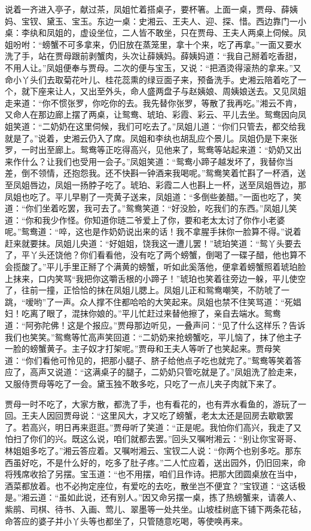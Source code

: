 \documentclass[12pt,oneside]{book}
\begin{document}
说着一齐进入亭子，献过茶，凤姐忙着搭桌子，要杯箸。上面一桌，贾母、薛姨妈、宝钗、黛玉、宝玉。东边一桌：史湘云、王夫人、迎、探、惜。西边靠门一小桌：李纨和凤姐的，虚设坐位，二人皆不敢坐，只在贾母、王夫人两桌上伺候。凤姐吩咐：“螃蟹不可多拿来，仍旧放在蒸笼里，拿十个来，吃了再拿。”一面又要水洗了手，站在贾母跟前剥蟹肉，头次让薛姨妈。薛姨妈道：“我自己掰着吃香甜，不用人让。”凤姐便奉与贾母。二次的便与宝玉，又说：“把酒烫得滚热的拿来。”又命小丫头们去取菊花叶儿、桂花蕊熏的绿豆面子来，预备洗手。史湘云陪着吃了一个，就下座来让人，又出至外头，命人盛两盘子与赵姨娘、周姨娘送去。又见凤姐走来道：“你不惯张罗，你吃你的去。我先替你张罗，等散了我再吃。”湘云不肯，又命人在那边廊上摆了两桌，让鸳鸯、琥珀、彩霞、彩云、平儿去坐。鸳鸯因向凤姐笑道：“二奶奶在这里伺候，我们可吃去了。”凤姐儿道：“你们只管去，都交给我就是了。”说着，史湘云仍入了席。凤姐和李纨也胡乱应个景儿。凤姐仍是下来张罗，一时出至廊上。鸳鸯等正吃得高兴，见他来了，鸳鸯等站起来道：“奶奶又出来作什么？让我们也受用一会子。”凤姐笑道：“鸳鸯小蹄子越发坏了，我替你当差，倒不领情，还抱怨我。还不快斟一钟酒来我喝呢。”鸳鸯笑着忙斟了一杯酒，送至凤姐唇边，凤姐一扬脖子吃了。琥珀、彩霞二人也斟上一杯，送至凤姐唇边，那凤姐也吃了。平儿早剔了一壳黄子送来，凤姐道：“多倒些姜醋。”一面也吃了，笑道：“你们坐着吃罢，我可去了。”鸳鸯笑道：“好没脸，吃我们的东西。”凤姐儿笑道：“你和我少作怪。你知道你琏二爷爱上了你，要和老太太讨了你作小老婆呢。”鸳鸯道：“啐，这也是作奶奶说出来的话！我不拿腥手抹你一脸算不得。”说着赶来就要抹。凤姐儿央道：“好姐姐，饶我这一遭儿罢！”琥珀笑道：“鸳丫头要去了，平丫头还饶他？你们看看他，没有吃了两个螃蟹，倒喝了一碟子醋，他也算不会揽酸了。”平儿手里正掰了个满黄的螃蟹，听如此奚落他，便拿着螃蟹照着琥珀脸上抹来，口内笑骂“我把你这嚼舌根的小蹄子！”琥珀也笑着往旁边一躲，平儿使空了，往前一撞，正恰恰的抹在凤姐儿腮上。凤姐儿正和鸳鸯嘲笑，不防唬了一跳，“嗳哟”了一声。众人撑不住都哈哈的大笑起来。凤姐也禁不住笑骂道：“死娼妇！吃离了眼了，混抹你娘的。”平儿忙赶过来替他擦了，亲自去端水。鸳鸯道：“阿弥陀佛！这是个报应。”贾母那边听见，一叠声问：“见了什么这样乐？告诉我们也笑笑。”鸳鸯等忙高声笑回道：“二奶奶来抢螃蟹吃，平儿恼了，抹了他主子一脸的螃蟹黄子。主子奴才打架呢。”贾母和王夫人等听了也笑起来。贾母笑道：“你们看他可怜见的，把那小腿子、脐子给他点子吃也就完了。”鸳鸯等笑着答应了，高声又说道：“这满桌子的腿子，二奶奶只管吃就是了。”凤姐洗了脸走来，又服侍贾母等吃了一会。黛玉独不敢多吃，只吃了一点儿夹子肉就下来了。

贾母一时不吃了，大家方散，都洗了手，也有看花的，也有弄水看鱼的，游玩了一回。王夫人因回贾母说：“这里风大，才又吃了螃蟹，老太太还是回房去歇歇罢了。若高兴，明日再来逛逛。”贾母听了笑道：“正是呢。我怕你们高兴，我走了又怕扫了你们的兴。既这么说，咱们就都去罢。”回头又嘱咐湘云：“别让你宝哥哥、林姐姐多吃了。”湘云答应着。又嘱咐湘云、宝钗二人说：“你两个也别多吃。那东西虽好吃，不是什么好的，吃多了肚子疼。”二人忙应着，送出园外，仍旧回来，命将残席收拾了另摆。宝玉道：“也不用摆，咱们且作诗。把那大团圆桌放在当中，酒菜都放着。也不必拘定座位，有爱吃的去吃，散坐岂不便宜？”宝钗道：“这话极是。”湘云道：“虽如此说，还有别人。”因又命另摆一桌，拣了热螃蟹来，请袭人、紫鹃、司棋、待书、入画、莺儿、翠墨等一处共坐。山坡桂树底下铺下两条花毡，命答应的婆子并小丫头等也都坐了，只管随意吃喝，等使唤再来。
\end{document}
